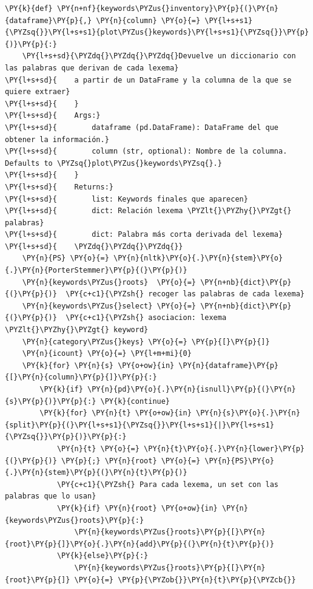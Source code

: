     \begin{tcolorbox}[breakable, size=fbox, boxrule=1pt, pad at break*=1mm,colback=cellbackground, colframe=cellborder]
\begin{Verbatim}[commandchars=\\\{\}]
\PY{k}{def} \PY{n+nf}{keywords\PYZus{}inventory}\PY{p}{(}\PY{n}{dataframe}\PY{p}{,} \PY{n}{column} \PY{o}{=} \PY{l+s+s1}{\PYZsq{}}\PY{l+s+s1}{plot\PYZus{}keywords}\PY{l+s+s1}{\PYZsq{}}\PY{p}{)}\PY{p}{:}
    \PY{l+s+sd}{\PYZdq{}\PYZdq{}\PYZdq{}Devuelve un diccionario con las palabras que derivan de cada lexema}
\PY{l+s+sd}{    a partir de un DataFrame y la columna de la que se quiere extraer}
\PY{l+s+sd}{    }
\PY{l+s+sd}{    Args:}
\PY{l+s+sd}{        dataframe (pd.DataFrame): DataFrame del que obtener la información.}
\PY{l+s+sd}{        column (str, optional): Nombre de la columna. Defaults to \PYZsq{}plot\PYZus{}keywords\PYZsq{}.}
\PY{l+s+sd}{    }
\PY{l+s+sd}{    Returns:}
\PY{l+s+sd}{        list: Keywords finales que aparecen}
\PY{l+s+sd}{        dict: Relación lexema \PYZlt{}\PYZhy{}\PYZgt{} palabras}
\PY{l+s+sd}{        dict: Palabra más corta derivada del lexema}
\PY{l+s+sd}{    \PYZdq{}\PYZdq{}\PYZdq{}}
    \PY{n}{PS} \PY{o}{=} \PY{n}{nltk}\PY{o}{.}\PY{n}{stem}\PY{o}{.}\PY{n}{PorterStemmer}\PY{p}{(}\PY{p}{)}
    \PY{n}{keywords\PYZus{}roots}  \PY{o}{=} \PY{n+nb}{dict}\PY{p}{(}\PY{p}{)}  \PY{c+c1}{\PYZsh{} recoger las palabras de cada lexema}
    \PY{n}{keywords\PYZus{}select} \PY{o}{=} \PY{n+nb}{dict}\PY{p}{(}\PY{p}{)}  \PY{c+c1}{\PYZsh{} asociacion: lexema \PYZlt{}\PYZhy{}\PYZgt{} keyword}
    \PY{n}{category\PYZus{}keys} \PY{o}{=} \PY{p}{[}\PY{p}{]}
    \PY{n}{icount} \PY{o}{=} \PY{l+m+mi}{0}
    \PY{k}{for} \PY{n}{s} \PY{o+ow}{in} \PY{n}{dataframe}\PY{p}{[}\PY{n}{column}\PY{p}{]}\PY{p}{:}
        \PY{k}{if} \PY{n}{pd}\PY{o}{.}\PY{n}{isnull}\PY{p}{(}\PY{n}{s}\PY{p}{)}\PY{p}{:} \PY{k}{continue}
        \PY{k}{for} \PY{n}{t} \PY{o+ow}{in} \PY{n}{s}\PY{o}{.}\PY{n}{split}\PY{p}{(}\PY{l+s+s1}{\PYZsq{}}\PY{l+s+s1}{|}\PY{l+s+s1}{\PYZsq{}}\PY{p}{)}\PY{p}{:}
            \PY{n}{t} \PY{o}{=} \PY{n}{t}\PY{o}{.}\PY{n}{lower}\PY{p}{(}\PY{p}{)} \PY{p}{;} \PY{n}{root} \PY{o}{=} \PY{n}{PS}\PY{o}{.}\PY{n}{stem}\PY{p}{(}\PY{n}{t}\PY{p}{)}
            \PY{c+c1}{\PYZsh{} Para cada lexema, un set con las palabras que lo usan}
            \PY{k}{if} \PY{n}{root} \PY{o+ow}{in} \PY{n}{keywords\PYZus{}roots}\PY{p}{:}                
                \PY{n}{keywords\PYZus{}roots}\PY{p}{[}\PY{n}{root}\PY{p}{]}\PY{o}{.}\PY{n}{add}\PY{p}{(}\PY{n}{t}\PY{p}{)}
            \PY{k}{else}\PY{p}{:}
                \PY{n}{keywords\PYZus{}roots}\PY{p}{[}\PY{n}{root}\PY{p}{]} \PY{o}{=} \PY{p}{\PYZob{}}\PY{n}{t}\PY{p}{\PYZcb{}}
    

\end{Verbatim}
\end{tcolorbox}
